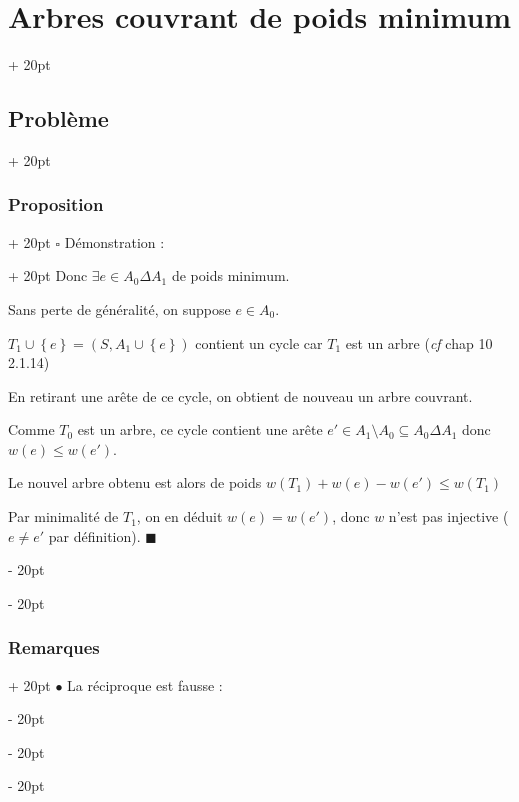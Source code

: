 \documentclass[a4paper, 12pt, twoside]{article}
\newcommand{\set}[1]{\left\{ #1 \right\}}
\renewcommand{\le}{\leqslant}
\newcommand{\ind}[1][20pt]{\advance\leftskip + #1}
\newcommand{\deind}[1][20pt]{\advance\leftskip - #1}
\newenvironment{indt}[2][20pt]{#2 \par \ind[#1]}{\par \deind} %
\newenvironment{proof}[1][{Démonstration :}]{\begin{indt}{$\square$ #1}}{$\blacksquare$ \end{indt}}
\begin{document}
\begin{indt}{\section{Arbres couvrant de poids minimum}}
\begin{indt}{\subsection{Problème}}
\begin{indt}{\subsubsection{Proposition}}
\begin{proof}
                    Donc $\exists e \in A_0 \Delta A_1$ de poids minimum.

                    Sans perte de généralité, on suppose $e \in A_0$.

                    $T_1 \cup \set e = (S, A_1 \cup \set e)$ contient un cycle car $T_1$ est un arbre (\textit{cf} chap 10 2.1.14)

                    En retirant une arête de ce cycle, on obtient de nouveau un arbre couvrant.

                    Comme $T_0$ est un arbre, ce cycle contient une arête $e' \in A_1 \setminus A_0 \subseteq A_0 \Delta A_1$ donc $w(e) \le w(e')$.

                    Le nouvel arbre obtenu est alors de poids $w(T_1) + w(e) - w(e') \le w(T_1)$

                    Par minimalité de $T_1$, on en déduit $w(e) = w(e')$, donc $w$ n'est pas injective ($e \neq e'$ par définition).
                \end{proof}
            \end{indt}

            \vspace{12pt}
            
            \begin{indt}{\subsubsection{Remarques}}
                $\bullet$ La réciproque est fausse :

                \begin{center}
                \end{center}


\end{indt}
\end{indt}
\end{indt}
\end{document}
